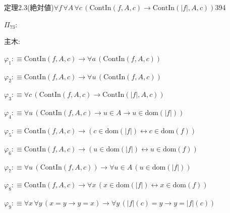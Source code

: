 \begin{fullproof}{定理2.3(絶対値)}{$\forall f\,\forall A\,\forall c\,(\mathrm{ContIn}(f,A,c) \to \mathrm{ContIn}(\lvert f \rvert,A,c))$}{394}
\begin{ptree}
\noLine
{}
\noLine
{}
\end{ptree}
\noindent$\Pi_{73}$:
\begin{ptree}
\noLine
{}
\noLine
{}
\end{ptree}
\noindent 主木:
\begin{ptree}
\noLine
{}
\noLine
{}
\end{ptree}
\begin{abbrevlist}
\item $\varphi_{1} :\equiv \mathrm{ContIn}(f,A,c) \to \forall a\,(\mathrm{ContIn}(f,A,c))$
\item $\varphi_{2} :\equiv \mathrm{ContIn}(f,A,c) \to \forall u\,(\mathrm{ContIn}(f,A,c))$
\item $\varphi_{3} :\equiv \forall c\,(\mathrm{ContIn}(f,A,c) \to \mathrm{ContIn}(\lvert f \rvert,A,c))$
\item $\varphi_{4} :\equiv \forall u\,(\mathrm{ContIn}(f,A,c) \to u \in A \to u \in \mathrm{dom}(\lvert f \rvert))$
\item $\varphi_{5} :\equiv \mathrm{ContIn}(f,A,c) \to (c \in \mathrm{dom}(\lvert f \rvert) \leftrightarrow c \in \mathrm{dom}(f))$
\item $\varphi_{6} :\equiv \mathrm{ContIn}(f,A,c) \to (u \in \mathrm{dom}(\lvert f \rvert) \leftrightarrow u \in \mathrm{dom}(f))$
\item $\varphi_{7} :\equiv \forall u\,(\mathrm{ContIn}(f,A,c)) \to \forall u \in A\,(u \in \mathrm{dom}(\lvert f \rvert))$
\item $\varphi_{8} :\equiv \mathrm{ContIn}(f,A,c) \to \forall x\,(x \in \mathrm{dom}(\lvert f \rvert) \leftrightarrow x \in \mathrm{dom}(f))$
\item $\varphi_{9} :\equiv \forall x\,\forall y\,(x = y \to y = x) \to \forall y\,(\lvert f \rvert(c) = y \to y = \lvert f \rvert(c))$

\end{abbrevlist}
\end{fullproof}
